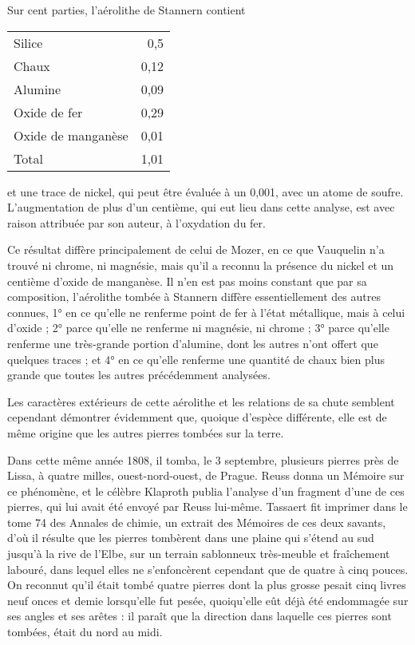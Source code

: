 \documentclass[a4paper, 12pt, oneside, french]{article}
\begin{document}
Sur cent parties, l'aérolithe de Stannern contient
\begin{table}[H]
    \centering
    \begin{tabular}{l r}
        Silice & 0,5 \\
        Chaux & 0,12 \\ 
        Alumine & 0,09 \\
        Oxide de fer & 0,29 \\
        Oxide de manganèse & 0,01 \\ \hline
        Total & 1,01 \\
    \end{tabular}
\end{table}
et une trace de nickel, qui peut être évaluée à un 0,001, avec un atome de soufre. L'augmentation de plus d'un centième, qui eut lieu dans cette analyse, est avec raison attribuée par son auteur, à l'oxydation du fer.

Ce résultat diffère principalement de celui de Mozer, en ce que Vauquelin n'a trouvé ni chrome, ni magnésie, mais qu'il a reconnu la présence du nickel et un centième d'oxide de manganèse. Il n'en est pas moins constant que par sa composition, l'aérolithe tombée à Stannern diffère essentiellement des autres connues, 1° en ce qu'elle ne renferme point de fer à l'état métallique, mais à celui d'oxide ; 2° parce qu'elle ne renferme ni magnésie, ni chrome ; 3° parce qu'elle renferme une très-grande portion d'alumine, dont les autres n'ont offert que quelques traces ; et 4° en ce qu'elle renferme une quantité de chaux bien plus grande que toutes les autres précédemment analysées.

Les caractères extérieurs de cette aérolithe et les relations de sa chute semblent cependant démontrer évidemment que, quoique d'espèce différente, elle est de même origine que les autres pierres tombées sur la terre.

Dans cette même année 1808, il tomba, le 3 septembre, plusieurs pierres près de Lissa, à quatre milles, ouest-nord-ouest, de Prague. Reuss donna un Mémoire sur ce phénomène, et le célèbre Klaproth publia l'analyse d'un fragment d'une de ces pierres, qui lui avait été envoyé par Reuss lui-même. Tassaert fit imprimer dans le tome 74 des Annales de chimie, un extrait des Mémoires de ces deux savants, d'où il résulte que les pierres tombèrent dans une plaine qui s'étend au sud jusqu'à la rive de l'Elbe, sur un terrain sablonneux très-meuble et fraîchement labouré, dans lequel elles ne s'enfoncèrent cependant que de quatre à cinq pouces. On reconnut qu'il était tombé quatre pierres dont la plus grosse pesait cinq livres neuf onces et demie lorsqu'elle fut pesée, quoiqu'elle eût déjà été endommagée sur ses angles et ses arêtes : il paraît que la direction dans laquelle ces pierres sont tombées, était du nord au midi.
\end{document}
